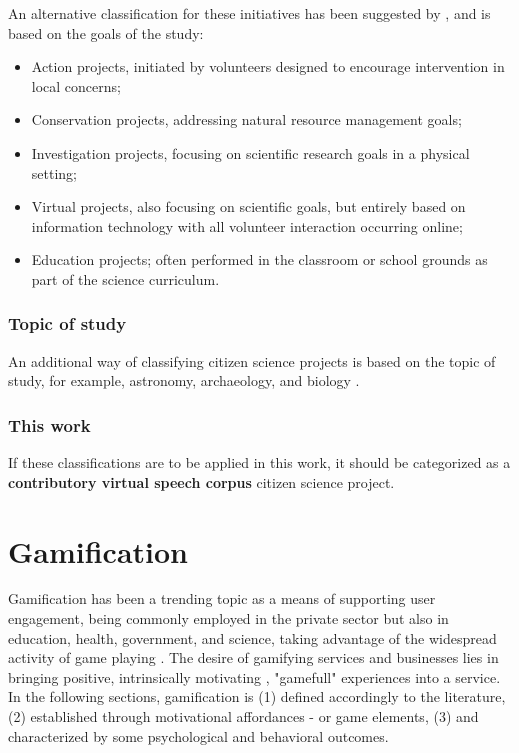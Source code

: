An alternative classification for these initiatives has been suggested by \cite{wiggins2011conservation}, and is based on the goals of the study:

\begin{itemize}
    \item Action projects, initiated by volunteers designed to encourage intervention in local concerns;
    \item Conservation projects, addressing natural resource management goals;
    \item Investigation projects, focusing on scientific research goals in a physical setting;
    \item Virtual projects, also focusing on scientific goals, but entirely based on information technology with all volunteer interaction occurring online;
    \item Education projects; often performed in the classroom or school grounds as part of the science curriculum.
\end{itemize}

\subsubsection{Topic of study}

An additional way of classifying citizen science projects is based on the topic of study, for example, astronomy, archaeology, and biology \cite{wiggins2011conservation}. 

\subsubsection{This work}

If these classifications are to be applied in this work, it should be categorized as a \textbf{contributory virtual speech corpus} citizen science project.

\section{Gamification}

Gamification has been a trending topic as a means of supporting user engagement, being commonly employed in the private sector but also in education, health, government, and science, taking advantage of the widespread activity of game playing \cite{kreitmair2019citizen}. The desire of gamifying services and businesses lies in bringing positive, intrinsically motivating \cite{ryan2000self}, "gamefull" experiences \cite{huotari2012defining} into a service. In the following sections, gamification is (1) defined accordingly to the literature, (2) established through motivational affordances - or game elements, (3) and characterized by some psychological and behavioral outcomes.

